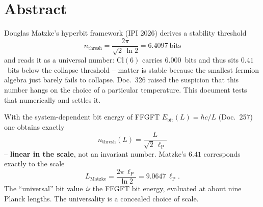 
\providecommand{\K}{}\renewcommand{\K}{\textbf{[K]}}
\providecommand{\B}{}\renewcommand{\B}{\textbf{[B]}}
\renewcommand{\S}{\textbf{[S]}}
\providecommand{\X}{}\renewcommand{\X}{\textbf{[X]}}
\providecommand{\lP}{}\renewcommand{\lP}{\ell_{\mathrm{P}}}
\providecommand{\mP}{}\renewcommand{\mP}{m_{\mathrm{P}}}
\providecommand{\TP}{}\renewcommand{\TP}{T_{\mathrm{P}}}
\providecommand{\Ebit}{}\renewcommand{\Ebit}{E_{\mathrm{bit}}}
\providecommand{\mbit}{}\renewcommand{\mbit}{m_{\mathrm{bit}}}
\providecommand{\nthr}{}\renewcommand{\nthr}{n_{\mathrm{thresh}}}
\providecommand{\Mcoll}{}\renewcommand{\Mcoll}{M_{\mathrm{coll}}}


\section*{Abstract}

Douglas Matzke's hyperbit framework (IPI 2026) derives a stability
threshold
\begin{equation}
  \nthr = \frac{2\pi}{\sqrt{2}\,\ln 2} = 6.4097~\text{bits}
\end{equation}
and reads it as a universal number: $\mathrm{Cl}(6)$ carries $6.000$~bits
and thus sits $0.41$~bits below the collapse threshold -- matter is stable
because the smallest fermion algebra just barely fails to collapse.
Doc.~326 raised the suspicion that this number hangs on the choice of a
particular temperature. This document tests that numerically and settles it.

\begin{tcolorbox}[ffgftbox, title={Main result \B}]
  With the system-dependent bit energy of FFGFT
  $\Ebit(L) = \hbar c/L$ (Doc.~257) one obtains exactly
  \begin{equation}
    \nthr(L) = \frac{L}{\sqrt{2}\,\lP}
    \label{eq:main}
  \end{equation}
  -- \textbf{linear in the scale}, not an invariant number.
  Matzke's $6.41$ corresponds exactly to the scale
  \begin{equation}
    L_{\mathrm{Matzke}} = \frac{2\pi\,\lP}{\ln 2} = 9.0647\,\lP .
  \end{equation}
  The \enquote{universal} bit value \emph{is} the FFGFT bit energy,
  evaluated at about nine Planck lengths.
  The universality is a concealed choice of scale.
\end{tcolorbox}

